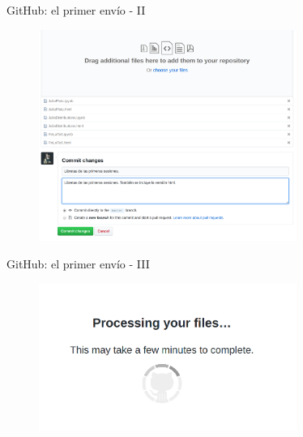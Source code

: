 \documentclass{beamer}
\begin{document}
\begin{frame}{GitHub: el primer env\'i{}o - II}
  \begin{figure}[hp]
    \centering \includegraphics[width=0.75\textwidth]{fig/04The1stCommit}
    \label{fig:git1stcii}
  \end{figure}
\end{frame}

\begin{frame}{GitHub: el primer env\'i{}o - III}
  \begin{figure}[hp]
    \centering \includegraphics[width=0.75\textwidth]{fig/05The1stCommit}
    \label{fig:git1stciii}
  \end{figure}
\end{frame}
\end{document}
